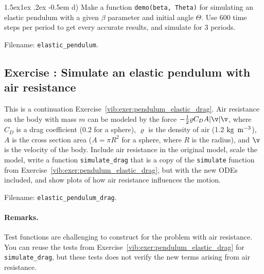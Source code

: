 \documentclass[%
oneside,                 %
final,                   %
10pt]{article}
\makeatletter
\newenvironment{doconceexercise}{}{}
\newcounter{doconceexercisecounter}
\newcommand\subex{\@startsection{paragraph}{4}{\z@}%
                  {1.5ex\@plus1ex \@minus.2ex}%
                  {-0.5em}%
                  {\normalfont\normalsize\bfseries}}
\makeatother
\begin{document}
\begin{doconceexercise}

\subex{d)}
Make a function \texttt{demo(beta, Theta)} for simulating an elastic pendulum with a
given $\beta$ parameter and initial angle $\Theta$. Use 600 time steps
per period to get every accurate results, and simulate for 3 periods.



\noindent Filename: \Verb!elastic_pendulum!.

\end{doconceexercise}




\begin{doconceexercise}

\subsection*{Exercise \thedoconceexercisecounter: Simulate an elastic pendulum with air resistance}

\label{vib:exer:pendulum_elastic_drag}

This is a continuation Exercise~\ref{vib:exer:pendulum_elastic_drag}.
Air resistance on the body with mass $m$ can be modeled by the
force $-\frac{1}{2}\varrho C_D A|\v|\v$,
where $C_D$ is a drag coefficient (0.2 for a sphere), $\varrho$
is the density of air (1.2 $\hbox{kg }\,{\hbox{m}}^{-3}$), $A$ is the
cross section area ($A=\pi R^2$ for a sphere, where $R$ is the radius),
and $\v$ is the velocity of the body.
Include air resistance in the original model, scale the model,
write a function \Verb!simulate_drag! that is a copy of the \texttt{simulate}
function from Exercise~\ref{vib:exer:pendulum_elastic_drag}, but with the
new ODEs included, and show plots of how air resistance
influences the motion.


\noindent Filename: \Verb!elastic_pendulum_drag!.


\paragraph{Remarks.}
Test functions are challenging to construct for the problem with
air resistance. You can reuse the tests from
Exercise~\ref{vib:exer:pendulum_elastic_drag} for \Verb!simulate_drag!,
but these tests does not verify the new terms arising from air
resistance.






\end{doconceexercise}
\end{document}
